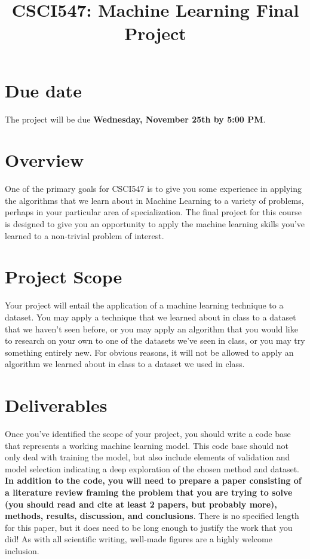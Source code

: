 \documentclass[12pt]{article}
\title{CSCI547: Machine Learning Final Project}
\begin{document}
\maketitle

\section*{Due date}
The project will be due {\bf Wednesday, November 25th by 5:00 PM}.

\section*{Overview}
One of the primary goals for CSCI547 is to give you some experience in applying the algorithms that we learn about in Machine Learning to a variety of problems, perhaps in your particular area of specialization.  The final project for this course is designed to give you an opportunity to apply the machine learning skills you've learned to a non-trivial problem of interest.

\section*{Project Scope}
Your project will entail the application of a machine learning technique to a dataset.  You may apply a technique that we learned about in class to a dataset that we haven't seen before, or you may apply an algorithm that you would like to research on your own to one of the datasets we've seen in class, or you may try something entirely new.  For obvious reasons, it will not be allowed to apply an algorithm we learned about in class to a dataset we used in class.   

\section*{Deliverables}
Once you've identified the scope of your project, you should write a code base that represents a working machine learning model.  This code base should not only deal with training the model, but also include elements of validation and model selection indicating a deep exploration of the chosen method and dataset.  {\bf In addition to the code, you will need to prepare a paper consisting of a literature review framing the problem that you are trying to solve (you should read and cite at least 2 papers, but probably more), methods, results, discussion, and conclusions}.  There is no specified length for this paper, but it does need to be long enough to justify the work that you did!  As with all scientific writing, well-made figures are a highly welcome inclusion.    
\end{document}
